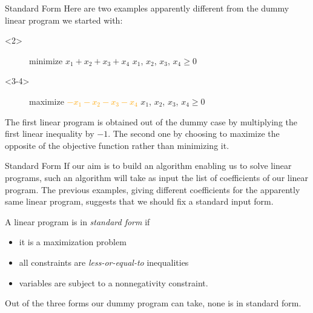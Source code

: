 \documentclass[aspectratio = 169]{beamer}
\begin{document}
\begin{frame}{Standard Form}
  Here are two examples apparently different from the dummy linear
  program we started with:
    \begin{overlayarea}{\textwidth}{.5\textheight}
    \begin{onlyenv}<2>
    \begin{figure}
        \begin{linearProg}{
            minimize
            }{
            $x_1 + x_2 + x_3 + x_4$
            }{
            }{
            $x_1$, $x_2$, $x_3$, $x_4 \geq 0$
            }
        \end{linearProg}
    \end{figure}
    \end{onlyenv}
    \begin{onlyenv}<3-4>
        \vspace{-1em}
    \begin{figure}
        \begin{linearProg}{
            maximize
            }{
            \textcolor{orange}{$-x_1 - x_2 - x_3 - x_4$}
            }{
            }{
            $x_1$, $x_2$, $x_3$, $x_4 \geq 0$
            }
        \end{linearProg}
    \end{figure}
    \end{onlyenv}
    \end{overlayarea}
    \pause[4]
    The first linear program is obtained out of the dummy case by
    multiplying the first linear inequality by $-1$. The second one by
    choosing to maximize the opposite of the objective function rather
    than minimizing it.
\end{frame}

\begin{frame}{Standard Form}
  If our aim is to build an algorithm enabling us to solve linear
  programs, such an algorithm will take as input the list of
  coefficients of our linear program. The previous examples, giving
  different coefficients for the apparently same linear program,
  suggests that we should fix a standard input form.
    \begin{defn}
      A linear program is in \emph{standard form} if
      \begin{itemize}
      \item[\textbullet] it is a maximization problem
      \item[\textbullet] all constraints are \textit{less-or-equal-to}
        inequalities
      \item[\textbullet] variables are subject to a nonnegativity
        constraint.
      \end{itemize}
    \end{defn}
    Out of the three forms our dummy program can take, none is in
    standard form.
\end{frame}
\end{document}
